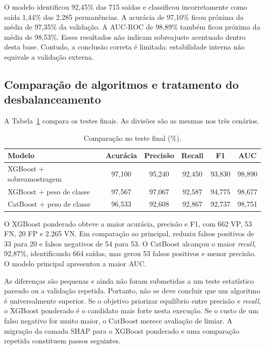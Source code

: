 \documentclass[12pt]{article}
\begin{document}
O modelo identificou 92,45\% das 715 saídas e classificou incorretamente como saída 1,44\% das 2.285 permanências. A acurácia de 97,10\% ficou próxima da média de 97,35\% da validação. A AUC-ROC de 98,89\% também ficou próxima da média de 98,53\%. Esses resultados não indicam sobreajuste acentuado dentro desta base. Contudo, a conclusão correta é limitada: estabilidade interna não equivale a validação externa.

\subsection{Comparação de algoritmos e tratamento do desbalanceamento}

A Tabela~\ref{tab:comparacao} compara os testes finais. As divisões são as mesmas nos três cenários.

\begin{table}[ht]
\centering
\caption{Comparação no teste final (\%).}
\label{tab:comparacao}
\small
\begin{tabular}{lccccc}
\toprule
Modelo & Acurácia & Precisão & Recall & F1 & AUC \\
\midrule
XGBoost + sobreamostragem & 97,100 & 95,240 & 92,450 & 93,830 & 98,890 \\
XGBoost + peso de classe & 97,567 & 97,067 & 92,587 & 94,775 & 98,677 \\
CatBoost + peso de classe & 96,533 & 92,608 & 92,867 & 92,737 & 98,751 \\
\bottomrule
\end{tabular}
\end{table}

O XGBoost ponderado obteve a maior acurácia, precisão e F1, com 662 VP, 53 FN, 20 FP e 2.265 VN. Em comparação ao principal, reduziu falsos positivos de 33 para 20 e falsos negativos de 54 para 53. O CatBoost alcançou o maior \textit{recall}, 92,87\%, identificando 664 saídas, mas gerou 53 falsos positivos e menor precisão. O modelo principal apresentou a maior AUC.

As diferenças são pequenas e ainda não foram submetidas a um teste estatístico pareado ou a validação repetida. Portanto, não se deve concluir que um algoritmo é universalmente superior. Se o objetivo priorizar equilíbrio entre precisão e \textit{recall}, o XGBoost ponderado é o candidato mais forte nesta execução. Se o custo de um falso negativo for muito maior, o CatBoost merece avaliação de limiar. A migração da camada SHAP para o XGBoost ponderado e uma comparação repetida constituem passos seguintes.
\end{document}
